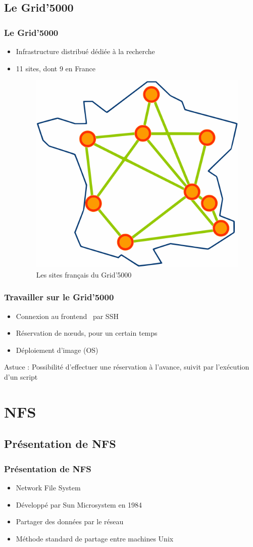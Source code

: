 \documentclass[blue]{beamer}
\begin{document}
	\subsection{Le Grid'5000}
	\begin{frame}
		\frametitle{Le Grid'5000}
		\begin{itemize}
			\item Infrastructure distribué dédiée à la recherche
			\item 11 sites, dont 9 en France
			\begin{figure}
				\includegraphics[width=0.3\linewidth]{../images/Site_map.png}
				\caption{Les sites français du Grid'5000}
			\end{figure}
		\end{itemize}
	\end{frame}

	\begin{frame}
		\frametitle{Travailler sur le Grid'5000}
		\begin{itemize}
			\item Connexion au \og frontend\fg~ par SSH
			\item Réservation de nœuds, pour un certain temps
			\item Déploiement d'image (OS)
		\end{itemize}

		\begin{block}{Astuce :}
			Possibilité d'effectuer une réservation à l'avance, suivit par l'exécution d'un script
		\end{block}
	\end{frame}

\section{NFS}
  \subsection{Présentation de NFS}
\begin{frame}
  \frametitle{Présentation de NFS}
  \begin{itemize}
    \item Network File System
    \item Développé par Sun Microsystem en 1984
    \item Partager des données par le réseau
    \item Méthode standard de partage entre machines Unix
  \end{itemize}
\end{frame}
\end{document}
